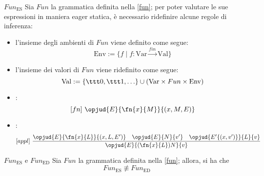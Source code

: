 \documentclass[a4paper, 12pt]{report}
\begin{document}
    \begin{framedprop}[breakable]{$Fun_\mathrm{ES}$}
        Sia $Fun$ la grammatica definita nella \cref{fun}; per poter valutare le sue espressioni in maniera eager statica, è necessario ridefinire alcune regole di inferenza:

        \begin{itemize}
            \item l'insieme degli ambienti di $Fun$ viene definito come segue: $$\mathrm{Env} := \{f \mid f : \mathrm{Var} \xrightarrow{fin} \mathrm{Val}\}$$
            \item l'insieme dei valori di $Fun$ viene ridefinito come segue: $$\mathrm{Val} := \{ \ttt 0, \ttt 1, \ldots \} \cup (\mathrm{Var} \times Fun \times \mathrm{Env})$$
            \item {}: $$[fn] \ \opjud{E}{\fn{x}{M}}{(x,M,E)}$$
            \item {}: $$[appl] \ \dfrac{\opjud{E}{\fn{x}{L}}{(x, L, E')} \quad \opjud{E}{N}{v'} \quad \opjud{E'\{(x,v')\}}{L}{v}}{\opjud{E}{(\fn{x}{L})N}{v}}$$
        \end{itemize}
    \end{framedprop}

    \begin{framedlem}[label={fun lemma pt1}]{$Fun_\mathrm{ES}$ e $Fun_\mathrm{ED}$}
        Sia $Fun$ la grammatica definita nella \cref{fun}; allora, si ha che $$Fun_\mathrm{ES} \not\equiv Fun_\mathrm{ED}$$
    \end{framedlem}
\end{document}
